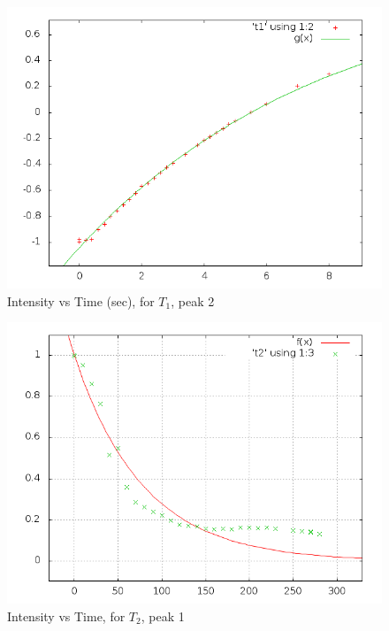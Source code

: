 		\begin{figure}[bth]
			\begin{center}
				\includegraphics[width=1.1\linewidth]{gfx/e3_T1P2}
			\end{center}
		\caption[$T_1$, peak 2]{Intensity vs Time (sec), for $T_1$, peak 2}
		\label{e3T1P2}
		\end{figure}

		\begin{figure}[bth]
			\begin{center}
				\includegraphics[width=1.1\linewidth]{gfx/e3_T2P1}
			\end{center}
		\caption[$T_2$, peak 1]{Intensity vs Time, for $T_2$, peak 1}
		\label{e3T2P1}
		\end{figure}

